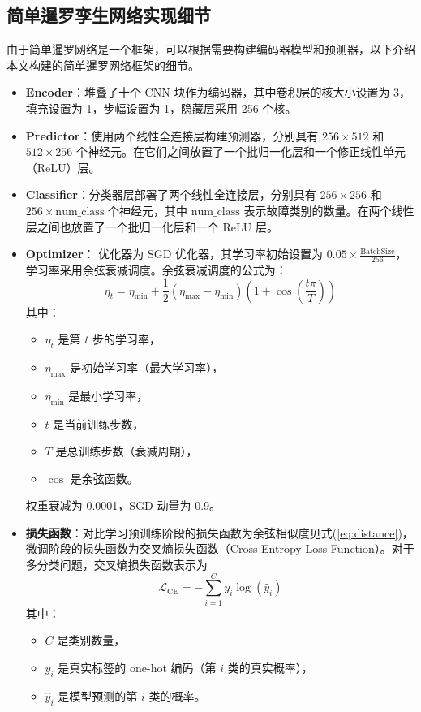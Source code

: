 \documentclass[master]{thesis-uestc}
\begin{document}
\subsection{简单暹罗孪生网络实现细节}
由于简单暹罗网络是一个框架，可以根据需要构建编码器模型和预测器，以下介绍本文构建的简单暹罗网络框架的细节。
\begin{itemize}
    \item \textbf{Encoder}：堆叠了十个 CNN 块作为编码器，其中卷积层的核大小设置为 3，填充设置为 1，步幅设置为 1，隐藏层采用 256 个核。
    
    \item \textbf{Predictor}：使用两个线性全连接层构建预测器，分别具有 \( 256 \times 512 \) 和 \( 512 \times 256 \) 个神经元。在它们之间放置了一个批归一化层和一个修正线性单元（ReLU）层。

    \item \textbf{Classifier}：分类器层部署了两个线性全连接层，分别具有 \( 256 \times 256 \) 和 \( 256 \times \text{num\_class} \) 个神经元，其中 \(\text{num\_class}\) 表示故障类别的数量。在两个线性层之间也放置了一个批归一化层和一个 ReLU 层。

    \item \textbf{Optimizer}：
        优化器为 SGD 优化器，其学习率初始设置为 \( 0.05 \times \frac{\text{BatchSize}}{256} \)，学习率采用余弦衰减调度。余弦衰减调度的公式为：
        \[
        \eta_t = \eta_{\text{min}} + \frac{1}{2} (\eta_{\text{max}} - \eta_{\text{min}}) \left(1 + \cos\left(\frac{t \pi}{T}\right)\right)
        \]
        其中：
        \begin{itemize}
            \item \(\eta_t\) 是第 \(t\) 步的学习率，
            \item \(\eta_{\text{max}}\) 是初始学习率（最大学习率），
            \item \(\eta_{\text{min}}\) 是最小学习率，
            \item \(t\) 是当前训练步数，
            \item \(T\) 是总训练步数（衰减周期），
            \item \(\cos\) 是余弦函数。
        \end{itemize}
        权重衰减为 0.0001，SGD 动量为 0.9。

    \item \textbf{损失函数}：对比学习预训练阶段的损失函数为余弦相似度见式(\ref{eq:distance})，微调阶段的损失函数为交叉熵损失函数（Cross-Entropy Loss Function）。对于多分类问题，交叉熵损失函数表示为
    \begin{equation}
        \mathcal{L}_{\text{CE}} = -\sum_{i=1}^{C} y_i \log(\hat{y}_i)
        \end{equation}        
        其中：
        \begin{itemize}
            \item \( C \) 是类别数量，
            \item \( y_i \) 是真实标签的 one-hot 编码（第 \( i \) 类的真实概率），
            \item \( \hat{y}_i \) 是模型预测的第 \( i \) 类的概率。
        \end{itemize}


\end{itemize}
\end{document}
